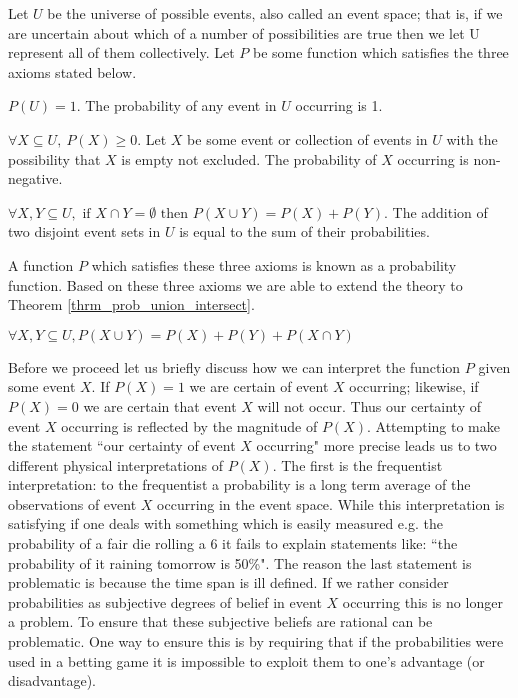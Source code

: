 \documentclass[../masters.tex]{subfiles}
\begin{document}
Let $U$ be the universe of possible events, also called an event space; that is, if we are uncertain about which of a number of possibilities are true then we let U represent all of them collectively. Let $P$ be some function which satisfies the three axioms stated below.
\begin{ax}
$P(U) = 1$. The probability of any event in $U$ occurring is 1.
\end{ax}
\begin{ax}
$\forall X \subseteq U,~P(X) \geq 0$. Let $X$ be some event or collection of events in $U$ with the possibility that $X$ is empty not excluded. The probability of $X$ occurring is non-negative.
\end{ax}
\begin{ax}
$\forall X, Y \subseteq U,\text{ if } X \cap Y = \emptyset \text{ then } P(X \cup Y) = P(X) + P(Y)$. The addition of two disjoint event sets in $U$ is equal to the sum of their probabilities.
\end{ax}
A function $P$ which satisfies these three axioms is known as a probability function. Based on these three axioms we are able to extend the theory to Theorem \ref{thrm_prob_union_intersect}.
\begin{thrm}
$\forall X, Y \subseteq U, P(X \cup Y) = P(X) + P(Y) + P(X \cap Y)$
\label{thrm_prob_union_intersect}
\end{thrm}
Before we proceed let us briefly discuss how we can interpret the function $P$ given some event $X$. If $P(X)=1$ we are certain of event $X$ occurring; likewise, if $P(X)=0$ we are certain that event $X$ will not occur. Thus our certainty of event $X$ occurring is reflected by the magnitude of $P(X)$. Attempting to make the statement ``our certainty of event $X$ occurring" more precise leads us to two different physical interpretations of $P(X)$. The first is the frequentist interpretation: to the frequentist a probability is a long term average of the observations of event $X$ occurring in the event space. While this interpretation is satisfying if one deals with something which is easily measured e.g. the probability of a fair die rolling a 6 it fails to explain statements like: ``the probability of it raining tomorrow is 50\%". The reason the last statement is problematic is because the time span is ill defined. If we rather consider probabilities as subjective degrees of belief in event $X$ occurring this is no longer a problem. To ensure that these subjective beliefs are rational can be problematic. One way to ensure this is by requiring that if the probabilities were used in a betting game it is impossible to exploit them to one's advantage (or disadvantage). 
\end{document}
